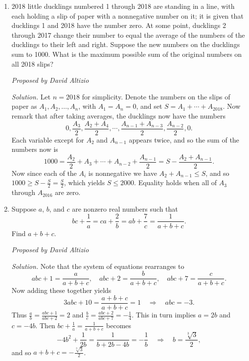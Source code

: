 \documentclass[10pt]{article}
\newcommand{\proposed}[1]
{
\vspace{5pt}
\noindent\textit{Proposed by #1}
}
\newcommand{\solution}
{
\vspace{5pt}
\noindent\textit{Solution.}\qquad
}
\begin{document}
\begin{enumerate}
\solution{Let $t$ be a real solution to $P(P(x)) = 0$.  Note that $P(P(t)) = 0$ implies that $P(t)$ is a root of the polynomial $P$.  These roots can be computed to be $-2\pm\sqrt 3$ by any method of your choice, so $t$ must satisfy either $t^2+4t+1 = -2+\sqrt 3$ or $t^2 + 4t + 1 = -2-\sqrt 3$; these are equivalent to $t^2 + 4t + 3-\sqrt 3 = 0$ and $t^2 + 4t + 3+\sqrt 3 = 0$ respectively.  Now it is easy to see that the minus solution has no real roots (since $3+\sqrt 3 > 4$), while the plus solution has two real roots with product $\boxed{3-\sqrt 3}$.}


\item 2018 little ducklings numbered 1 through 2018 are standing in a line, with each holding a slip of paper with a nonnegative number on it; it is given that ducklings 1 and 2018 have the number zero.  At some point, ducklings 2 through 2017 change their number to equal the average of the numbers of the ducklings to their left and right.  Suppose the new numbers on the ducklings sum to 1000.  What is the maximum possible sum of the original numbers on all 2018 slips?

\proposed{David Altizio}

\solution Let $n=2018$ for simplicity.  Denote the numbers on the slips of paper as $A_1,A_2,\ldots, A_{n}$, with $A_1 = A_{n} = 0$, and set $S=A_1 + \cdots + A_{2018}$.  Now remark that after taking averages, the ducklings now have the numbers \[0,\frac{A_3}2,\frac{A_2 + A_4}2,\cdots,\frac{A_{n-1} + A_{n-3}}2,\frac{A_{n-2}}2,0.\] Each variable except for $A_2$ and $A_{n-1}$ appears twice, and so the sum of the numbers now is \[1000 = \frac{A_2}2 + A_3 + \cdots + A_{n-2} + \frac{A_{n-1}}2 = S - \frac{A_2 + A_{n-1}}2.\] Now since each of the $A_i$ is nonnegative we have $A_2 + A_{n-1}\leq S$, and so $1000\geq S - \frac{S}2 = \frac{S}2$, which yields $S\leq\boxed{2000}$.  Equality holds when all of $A_3$ through $A_{2016}$ are zero.

\item Suppose $a$, $b$, and $c$ are nonzero real numbers such that \[bc+\frac1a = ca+\frac2b = ab+\frac7c = \frac1{a+b+c}.\] Find $a+b+c$.

\proposed{David Altizio}

\solution Note that the system of equations rearranges to \[abc+1=\frac{a}{a+b+c},\quad abc+2=\frac{b}{a+b+c},\quad abc+7 = \frac{c}{a+b+c}.\] Now adding these together yields \[3abc + 10 = \frac{a+b+c}{a+b+c} = 1\quad\Rightarrow\quad abc = -3.\] Thus $\frac ab = \frac{abc+1}{abc+2} = 2$ and $\frac bc = \frac{abc+2}{abc+7} = -\frac14$.  This in turn implies $a=2b$ and $c=-4b$.  Then $bc+\frac1a = \frac1{a+b+c}$ becomes \[-4b^2 + \frac1{2b} = \frac{1}{b + 2b - 4b} = -\frac1b\quad\Rightarrow\quad b = \frac{\sqrt[3]3}2,\] and so $a+b+c = \boxed{-\tfrac{\sqrt[3]3}2}$.


\end{enumerate}
\end{document}

